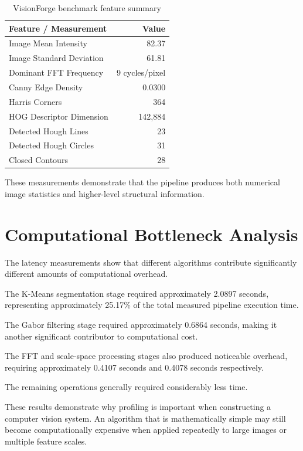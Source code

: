 \documentclass[11pt,a4paper]{article}
\begin{document}
\begin{table}[H]
\centering
\caption{VisionForge benchmark feature summary}
\label{tab:features}
\begin{tabular}{lr}
\toprule
\textbf{Feature / Measurement} & \textbf{Value}\\
\midrule
Image Mean Intensity & 82.37\\
Image Standard Deviation & 61.81\\
Dominant FFT Frequency & 9 cycles/pixel\\
Canny Edge Density & 0.0300\\
Harris Corners & 364\\
HOG Descriptor Dimension & 142,884\\
Detected Hough Lines & 23\\
Detected Hough Circles & 31\\
Closed Contours & 28\\
\bottomrule
\end{tabular}
\end{table}

These measurements demonstrate that the pipeline produces both numerical image statistics and higher-level structural information.


\section{Computational Bottleneck Analysis}

The latency measurements show that different algorithms contribute significantly different amounts of computational overhead.

The K-Means segmentation stage required approximately 2.0897 seconds, representing approximately 25.17\% of the total measured pipeline execution time.

The Gabor filtering stage required approximately 0.6864 seconds, making it another significant contributor to computational cost.

The FFT and scale-space processing stages also produced noticeable overhead, requiring approximately 0.4107 seconds and 0.4078 seconds respectively.

The remaining operations generally required considerably less time.

These results demonstrate why profiling is important when constructing a computer vision system. An algorithm that is mathematically simple may still become computationally expensive when applied repeatedly to large images or multiple feature scales.
\end{document}
